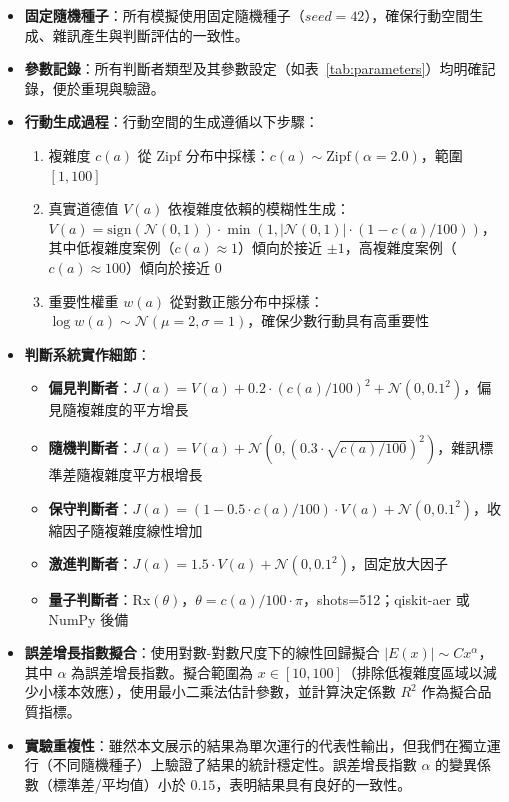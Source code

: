 \documentclass[12pt,a4paper]{article}
\theoremstyle{definition}
\theoremstyle{remark}
\begin{document}
\begin{itemize}
    \item \textbf{固定隨機種子}：所有模擬使用固定隨機種子（$seed = 42$），確保行動空間生成、雜訊產生與判斷評估的一致性。
    \item \textbf{參數記錄}：所有判斷者類型及其參數設定（如表~\ref{tab:parameters}）均明確記錄，便於重現與驗證。
    \item \textbf{行動生成過程}：行動空間的生成遵循以下步驟：
    \begin{enumerate}
        \item 複雜度 $c(a)$ 從 Zipf 分布中採樣：$c(a) \sim \text{Zipf}(\alpha=2.0)$，範圍 $[1, 100]$
        \item 真實道德值 $V(a)$ 依複雜度依賴的模糊性生成：$V(a) = \text{sign}(\mathcal{N}(0,1)) \cdot \min(1, |\mathcal{N}(0,1)| \cdot (1 - c(a)/100))$，其中低複雜度案例（$c(a) \approx 1$）傾向於接近 $\pm 1$，高複雜度案例（$c(a) \approx 100$）傾向於接近 $0$
        \item 重要性權重 $w(a)$ 從對數正態分布中採樣：$\log w(a) \sim \mathcal{N}(\mu=2, \sigma=1)$，確保少數行動具有高重要性
    \end{enumerate}
    \item \textbf{判斷系統實作細節}：
    \begin{itemize}
        \item \textbf{偏見判斷者}：$J(a) = V(a) + 0.2 \cdot (c(a)/100)^2 + \mathcal{N}(0, 0.1^2)$，偏見隨複雜度的平方增長
        \item \textbf{隨機判斷者}：$J(a) = V(a) + \mathcal{N}(0, (0.3 \cdot \sqrt{c(a)/100})^2)$，雜訊標準差隨複雜度平方根增長
        \item \textbf{保守判斷者}：$J(a) = (1 - 0.5 \cdot c(a)/100) \cdot V(a) + \mathcal{N}(0, 0.1^2)$，收縮因子隨複雜度線性增加
        \item \textbf{激進判斷者}：$J(a) = 1.5 \cdot V(a) + \mathcal{N}(0, 0.1^2)$，固定放大因子
        \item \textbf{量子判斷者}：Rx$(\theta)$，$\theta = c(a)/100 \cdot \pi$，shots=512；qiskit-aer 或 NumPy 後備
    \end{itemize}
    \item \textbf{誤差增長指數擬合}：使用對數-對數尺度下的線性回歸擬合 $|E(x)| \sim C x^\alpha$，其中 $\alpha$ 為誤差增長指數。擬合範圍為 $x \in [10, 100]$（排除低複雜度區域以減少小樣本效應），使用最小二乘法估計參數，並計算決定係數 $R^2$ 作為擬合品質指標。
    \item \textbf{實驗重複性}：雖然本文展示的結果為單次運行的代表性輸出，但我們在獨立運行（不同隨機種子）上驗證了結果的統計穩定性。誤差增長指數 $\alpha$ 的變異係數（標準差/平均值）小於 $0.15$，表明結果具有良好的一致性。
\end{itemize}
\end{document}

